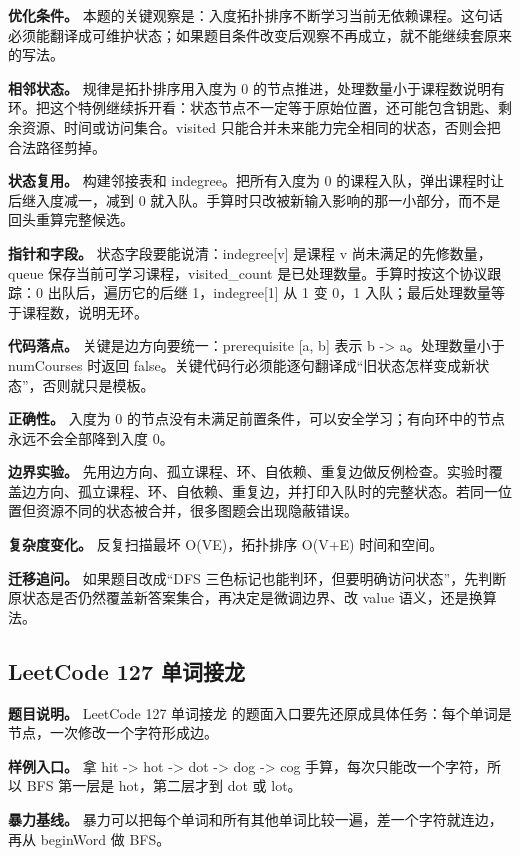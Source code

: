 \textbf{优化条件。} 本题的关键观察是：入度拓扑排序不断学习当前无依赖课程。这句话必须能翻译成可维护状态；如果题目条件改变后观察不再成立，就不能继续套原来的写法。

\textbf{相邻状态。} 规律是拓扑排序用入度为 0 的节点推进，处理数量小于课程数说明有环。把这个特例继续拆开看：状态节点不一定等于原始位置，还可能包含钥匙、剩余资源、时间或访问集合。visited 只能合并未来能力完全相同的状态，否则会把合法路径剪掉。

\textbf{状态复用。} 构建邻接表和 indegree。把所有入度为 0 的课程入队，弹出课程时让后继入度减一，减到 0 就入队。手算时只改被新输入影响的那一小部分，而不是回头重算完整候选。

\textbf{指针和字段。} 状态字段要能说清：indegree[v] 是课程 v 尚未满足的先修数量，queue 保存当前可学习课程，visited\_count 是已处理数量。手算时按这个协议跟踪：0 出队后，遍历它的后继 1，indegree[1] 从 1 变 0，1 入队；最后处理数量等于课程数，说明无环。

\textbf{代码落点。} 关键是边方向要统一：prerequisite [a, b] 表示 b -> a。处理数量小于 numCourses 时返回 false。关键代码行必须能逐句翻译成“旧状态怎样变成新状态”，否则就只是模板。

\textbf{正确性。} 入度为 0 的节点没有未满足前置条件，可以安全学习；有向环中的节点永远不会全部降到入度 0。

\textbf{边界实验。} 先用边方向、孤立课程、环、自依赖、重复边做反例检查。实验时覆盖边方向、孤立课程、环、自依赖、重复边，并打印入队时的完整状态。若同一位置但资源不同的状态被合并，很多图题会出现隐蔽错误。

\textbf{复杂度变化。} 反复扫描最坏 O(VE)，拓扑排序 O(V+E) 时间和空间。

\textbf{迁移追问。} 如果题目改成“DFS 三色标记也能判环，但要明确访问状态”，先判断原状态是否仍然覆盖新答案集合，再决定是微调边界、改 value 语义，还是换算法。

\subsection{LeetCode 127 单词接龙}

\textbf{题目说明。} LeetCode 127 单词接龙 的题面入口要先还原成具体任务：每个单词是节点，一次修改一个字符形成边。

\textbf{样例入口。} 拿 hit -> hot -> dot -> dog -> cog 手算，每次只能改一个字符，所以 BFS 第一层是 hot，第二层才到 dot 或 lot。

\textbf{暴力基线。} 暴力可以把每个单词和所有其他单词比较一遍，差一个字符就连边，再从 beginWord 做 BFS。

